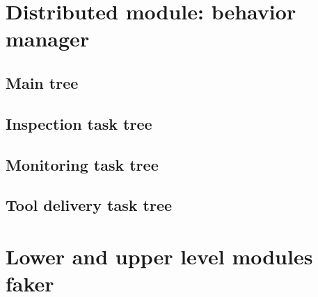 \section{Distributed module: behavior manager}
\label{sec:Distributed module: behavior manager}

\subsection{Main tree}
\label{sec:MainTree}


\subsection{Inspection task tree}
\label{sec:InspectionTaskTree}

\subsection{Monitoring task tree}
\label{sec:MonitoringTaskTree}

\subsection{Tool delivery task tree}
\label{sec:ToolDeliveryTaskTree}

\section{Lower and upper level modules faker}
\label{sec:LowerAndUpperLevelModulesFaker}

